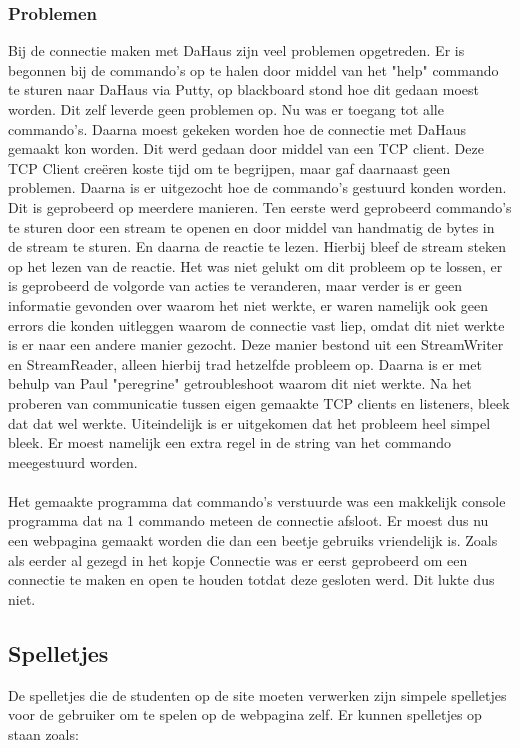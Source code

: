 \documentclass[11pt]{article}
\begin{document}
	\subsubsection{Problemen}
	
	Bij de connectie maken met DaHaus zijn veel problemen opgetreden. 
	Er is begonnen bij de commando's op te halen door middel van het "help" commando te sturen naar DaHaus via Putty, op blackboard stond hoe dit gedaan moest worden. Dit zelf leverde geen problemen op. Nu was er toegang tot alle commando's. Daarna moest gekeken worden hoe de connectie met DaHaus gemaakt kon worden. Dit werd gedaan door middel van een TCP client. Deze TCP Client cre\"{e}ren koste tijd om te begrijpen, maar gaf daarnaast geen problemen. Daarna is er uitgezocht hoe de commando's gestuurd konden worden. Dit is geprobeerd op meerdere manieren. Ten eerste werd geprobeerd commando's te sturen door een stream te openen en door middel van handmatig de bytes in de stream te sturen. En daarna de reactie te lezen. Hierbij bleef de stream steken op het lezen van de reactie. Het was niet gelukt om dit probleem op te lossen, er is geprobeerd de volgorde van acties te veranderen, maar verder is er geen informatie gevonden over waarom het niet werkte, er waren namelijk ook geen errors die konden uitleggen waarom de connectie vast liep, omdat dit niet werkte is er naar een andere manier gezocht. Deze manier bestond uit een StreamWriter en StreamReader, alleen hierbij trad hetzelfde probleem op. Daarna is er met behulp van Paul "peregrine" getroubleshoot waarom dit niet werkte. Na het proberen van communicatie tussen eigen gemaakte TCP clients en listeners, bleek dat dat wel werkte. Uiteindelijk is er uitgekomen dat het probleem heel simpel bleek. Er moest namelijk een extra regel in de string van het commando meegestuurd worden.
	\\
	\\
	Het gemaakte programma dat commando's verstuurde was een makkelijk console programma dat na 1 commando meteen de connectie afsloot. Er moest dus nu een webpagina gemaakt worden die dan een beetje gebruiks vriendelijk is. Zoals als eerder al gezegd in het kopje Connectie was er eerst geprobeerd om een connectie te maken en open te houden totdat deze gesloten werd. Dit lukte dus niet.
	
	
	
	
	
	\subsection{Spelletjes}
	De spelletjes die de studenten op de site moeten verwerken zijn simpele spelletjes voor de gebruiker om te spelen op de webpagina zelf. Er kunnen spelletjes op staan zoals: 
	
\end{document}
